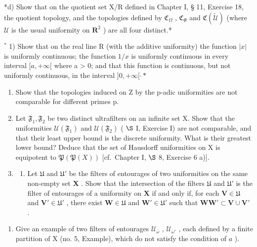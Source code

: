 *d) Show that on the quotient set X/R defined in Chapter I, § 11, Exercise 18, the quotient topology, and the topologies defined by \(\mathfrak{C}_{\Omega}\) , \(\mathfrak{C}_{\Phi}\) and \(\mathfrak{C}(\tilde{\mathcal{U}})\) (where \(\mathcal{U}\) is the usual uniformity on \(\mathbf{R}^2\) ) are all four distinct.*

\BourbakiExerciseGroup

\(^{*}\) 1) Show that on the real line R (with the additive uniformity) the function \(|x|\) is uniformly continuous; the function \(1/x\) is uniformly continuous in every interval \([a, +\infty[\) where a \textgreater{} 0; and that this function is continuous, but not uniformly continuous, in the interval \(]0, +\infty[\cdot*\)

\begin{enumerate}
\def\labelenumi{\arabic{enumi})}
\setcounter{enumi}{1}
\item
  Show that the topologies induced on Z by the p-adic uniformities are not comparable for different primes p.
\item
  Let \(\mathfrak{F}_1, \mathfrak{F}_2\) be two distinct ultrafilters on an infinite set X. Show that the uniformities \(\mathcal{U}(\mathfrak{F}_1)\) and \(\mathcal{U}(\mathfrak{F}_2)\) ( \(\S\) I, Exercise I) are not comparable, and that their least upper bound is the discrete uniformity. What is their greatest lower bound? Deduce that the set of Hausdorff uniformities on X is equipotent to \(\mathfrak{P}(\mathfrak{P}(X))\) {[}cf.~Chapter I, \(\S\) 8, Exercise 6 a){]}.
\item
  \begin{enumerate}
  \def\labelenumii{\alph{enumii})}
  \tightlist
  \item
    Let \(\mathfrak{U}\) and \(\mathfrak{U}'\) be the filters of entourages of two uniformities on the same non-empty set \(\mathbf{X}\) . Show that the intersection of the filters \(\mathfrak{U}\) and \(\mathfrak{U}'\) is the filter of entourages of a uniformity on \(\mathbf{X}\) if and only if, for each \(\mathbf{V} \in \mathfrak{U}\) and \(\mathbf{V}' \in \mathfrak{U}'\) , there exist \(\mathbf{W} \in \mathfrak{U}\) and \(\mathbf{W}' \in \mathfrak{U}'\) such that \(\mathbf{WW}' \subset \mathbf{V} \cup \mathbf{V}'\) .
  \end{enumerate}
\end{enumerate}

\begin{enumerate}
\def\labelenumi{\alph{enumi})}
\setcounter{enumi}{1}
\tightlist
\item
  Give an example of two filters of entourages \(\mathcal{U}_{\overline{\omega}}\) , \(\mathcal{U}_{\overline{\omega}'}\) , each defined by a finite partition of X (no. 5, Example), which do not satisfy the condition of \(a\) ).
\end{enumerate}


